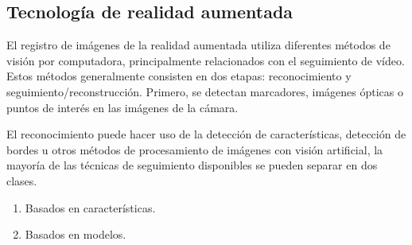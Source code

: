 \subsection{Tecnología de realidad aumentada}
El registro de imágenes de la realidad aumentada utiliza diferentes métodos de visión por computadora, principalmente relacionados con el seguimiento de vídeo. Estos métodos generalmente consisten en dos etapas: reconocimiento y seguimiento/reconstrucción. Primero, se detectan marcadores, imágenes ópticas o puntos de interés en las imágenes de la cámara.\cite{B27} \par
\vspace{5mm}
El reconocimiento puede hacer uso de la detección de características, detección de bordes u otros métodos de procesamiento de imágenes con visión artificial, la mayoría de las técnicas de seguimiento disponibles se pueden separar en dos clases. \par
\begin{enumerate}[1.]
	\item Basados en características.
	\item Basados en modelos.
\end{enumerate}

